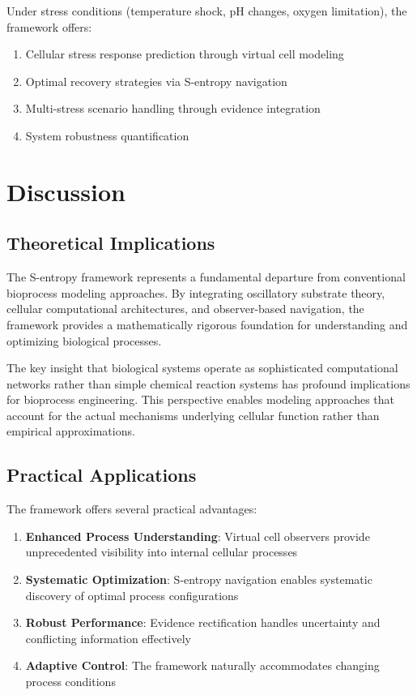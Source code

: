 \documentclass[12pt,a4paper]{article}
\begin{document}
Under stress conditions (temperature shock, pH changes, oxygen limitation), the framework offers:
\begin{enumerate}
\item Cellular stress response prediction through virtual cell modeling
\item Optimal recovery strategies via S-entropy navigation
\item Multi-stress scenario handling through evidence integration
\item System robustness quantification
\end{enumerate}

\section{Discussion}

\subsection{Theoretical Implications}

The S-entropy framework represents a fundamental departure from conventional bioprocess modeling approaches. By integrating oscillatory substrate theory, cellular computational architectures, and observer-based navigation, the framework provides a mathematically rigorous foundation for understanding and optimizing biological processes.

The key insight that biological systems operate as sophisticated computational networks rather than simple chemical reaction systems has profound implications for bioprocess engineering. This perspective enables modeling approaches that account for the actual mechanisms underlying cellular function rather than empirical approximations.

\subsection{Practical Applications}

The framework offers several practical advantages:
\begin{enumerate}
\item \textbf{Enhanced Process Understanding}: Virtual cell observers provide unprecedented visibility into internal cellular processes
\item \textbf{Systematic Optimization}: S-entropy navigation enables systematic discovery of optimal process configurations
\item \textbf{Robust Performance}: Evidence rectification handles uncertainty and conflicting information effectively
\item \textbf{Adaptive Control}: The framework naturally accommodates changing process conditions
\end{enumerate}
\end{document}
